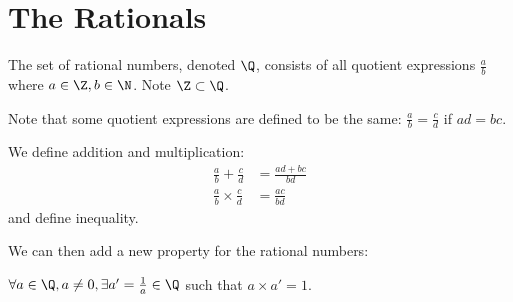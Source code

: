 \documentclass[../Main.tex]{subfiles}
\begin{document}
\section{The Rationals}
The set of rational numbers, denoted $\Q$, consists of all quotient expressions $\frac{a}{b}$ where $a \in \Z, b \in \N$. Note $\Z \subset \Q$.\par
Note that some quotient expressions are defined to be the same: $\frac{a}{b} = \frac{c}{d}$ if $ad = bc$.\par
We define addition and multiplication:
\begin{align*}
    \frac{a}{b} + \frac{c}{d} &= \frac{ad + bc}{bd} \\
    \frac{a}{b} \times \frac{c}{d} &= \frac{ac}{bd}
\end{align*}
and define inequality.\par %
We can then add a new property for the rational numbers:
\begin{propositions}{}
    \setcounter{subtheorem}{11} %
    \item $\forall a \in \Q, a \neq 0, \exists a' = \frac{1}{a} \in \Q$ such that $a \times a' = 1$.
\end{propositions}
\end{document}
